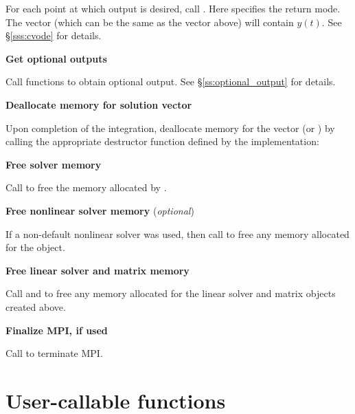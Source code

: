 \begin{Steps}
  For each point at which output is desired, call
  .
  Here  specifies the return mode.
  The vector  (which can be the same as
  the vector  above) will contain $y(t)$.
  See \S\ref{sss:cvode} for details.

\item
  {\bf Get optional outputs}

  Call  functions to obtain optional output.
  See \S\ref{ss:optional_output} for details.

\item
  {\bf Deallocate memory for solution vector}

  Upon completion of the integration, deallocate memory for the vector 
  (or ) by calling the appropriate destructor function defined by the
  {\nvector} implementation:


\item
  {\bf Free solver memory}

  Call  to free the memory allocated by {\cvode}.

\item
  {\bf Free nonlinear solver memory} (\textit{optional})

  If a non-default nonlinear solver was used, then call
   to free any memory allocated for the
  {\sunnonlinsol} object.

\item
  {\bf Free linear solver and matrix memory}

  Call  and  to free any memory
  allocated for the linear solver and matrix objects created above.

\item
  {\bf Finalize MPI, if used}

  Call  to terminate MPI.

\end{Steps}




\section{User-callable functions}\label{ss:callable_fct_sim}

